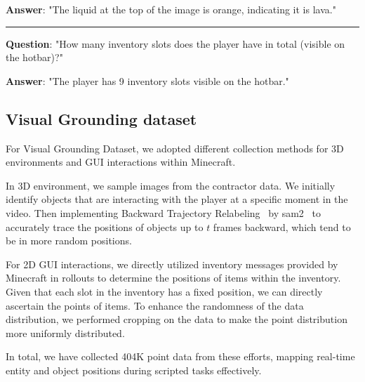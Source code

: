 \begin{prompt}[title={Example of Vision Language Alignment Datasets}, label=Vision Language Alignment Datasets]
\begin{center}
\begin{minipage}{\dimexpr0.95\linewidth}
\textbf{Answer}: "The liquid at the top of the image is orange, indicating it is lava."

\rule{\linewidth}{0.4pt}

\vspace{4pt}

\textbf{Question}: "How many inventory slots does the player have in total (visible on the hotbar)?"

\vspace{5pt}

\textbf{Answer}: "The player has 9 inventory slots visible on the hotbar."

\end{minipage} %
\end{center} %

\vspace{5pt}

\end{prompt}


\subsection{Visual Grounding dataset}

For Visual Grounding Dataset, we adopted different collection methods for 3D environments and GUI interactions within Minecraft. 

In 3D environment, we sample images from the contractor data. We initially identify objects that are interacting with the player at a specific moment in the video. Then implementing Backward Trajectory Relabeling~\citep{rocket1} by sam2~\citep{sam2} to accurately trace the positions of objects up to $t$ frames backward, which tend to be in more random positions.

For 2D GUI interactions, we directly utilized inventory messages provided by Minecraft in rollouts to determine the positions of items within the inventory. Given that each slot in the inventory has a fixed position, we can directly ascertain the points of items. To enhance the randomness of the data distribution, we performed cropping on the data to make the point distribution more uniformly distributed.

In total, we have collected 404K point data from these efforts, mapping real-time entity and object positions during scripted tasks effectively.

